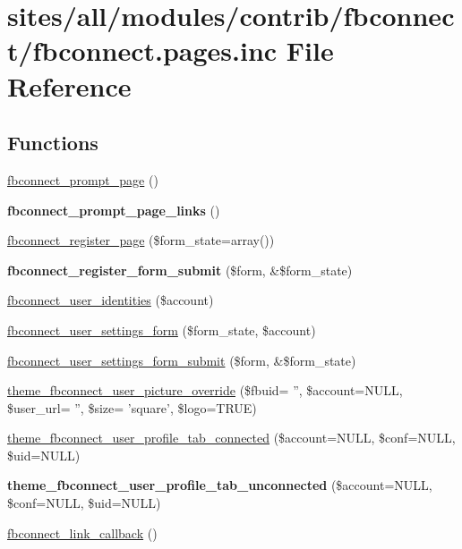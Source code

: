 \hypertarget{fbconnect_8pages_8inc}{
\section{sites/all/modules/contrib/fbconnect/fbconnect.pages.inc File Reference}
\label{fbconnect_8pages_8inc}
}
\subsection*{Functions}
\begin{CompactItemize}
\item 
\hyperlink{fbconnect_8pages_8inc_c464200735056c1bc0916e57462c82e7}{fbconnect\_\-prompt\_\-page} ()
\item 
\hypertarget{fbconnect_8pages_8inc_c2e89541cfd925770fe8880359905dd8}{
\textbf{fbconnect\_\-prompt\_\-page\_\-links} ()}
\label{fbconnect_8pages_8inc_c2e89541cfd925770fe8880359905dd8}

\item 
\hyperlink{fbconnect_8pages_8inc_b827485519ddd7ebdb381b9623a01dd6}{fbconnect\_\-register\_\-page} (\$form\_\-state=array())
\item 
\hypertarget{fbconnect_8pages_8inc_f82dfa5d01ed8468722f57055f71a639}{
\textbf{fbconnect\_\-register\_\-form\_\-submit} (\$form, \&\$form\_\-state)}
\label{fbconnect_8pages_8inc_f82dfa5d01ed8468722f57055f71a639}

\item 
\hyperlink{fbconnect_8pages_8inc_4c9a902194766c0f0671374dc132d8c3}{fbconnect\_\-user\_\-identities} (\$account)
\item 
\hyperlink{fbconnect_8pages_8inc_8d3b04be3466ffb204c2fc795b35e90e}{fbconnect\_\-user\_\-settings\_\-form} (\$form\_\-state, \$account)
\item 
\hyperlink{fbconnect_8pages_8inc_932ccba1394c39dc66c0b01f361935ba}{fbconnect\_\-user\_\-settings\_\-form\_\-submit} (\$form, \&\$form\_\-state)
\item 
\hyperlink{fbconnect_8pages_8inc_ff0cf6618c1630539af7e20931f21a89}{theme\_\-fbconnect\_\-user\_\-picture\_\-override} (\$fbuid= '', \$account=NULL, \$user\_\-url= '', \$size= 'square', \$logo=TRUE)
\item 
\hyperlink{fbconnect_8pages_8inc_f52fd707c975eb869c369774b5014bee}{theme\_\-fbconnect\_\-user\_\-profile\_\-tab\_\-connected} (\$account=NULL, \$conf=NULL, \$uid=NULL)
\item 
\hypertarget{fbconnect_8pages_8inc_efe6353814aa27ffd3c78f8679ccd6fd}{
\textbf{theme\_\-fbconnect\_\-user\_\-profile\_\-tab\_\-unconnected} (\$account=NULL, \$conf=NULL, \$uid=NULL)}
\label{fbconnect_8pages_8inc_efe6353814aa27ffd3c78f8679ccd6fd}

\item 
\hyperlink{fbconnect_8pages_8inc_48717fc4c41849877c0ec7a0eae21cbb}{fbconnect\_\-link\_\-callback} ()
\end{CompactItemize}


